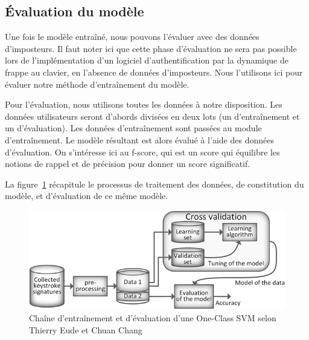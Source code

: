 \subsection{Évaluation du modèle}

Une fois le modèle entraîné, nous pouvons l'évaluer avec des données d'imposteurs. Il faut noter ici que cette phase d'évaluation ne sera pas possible lors de l'implémentation d'un logiciel d'authentification par la dynamique de frappe au clavier, en l'absence de données d'imposteurs. Nous l'utilisons ici pour évaluer notre méthode d'entraînement du modèle.

Pour l'évaluation, nous utilisons toutes les données à notre disposition. Les données utilisateurs seront d'abords divisées en deux lots (un d'entraînement et un d'évaluation). Les données d'entraînement sont passées au module d'entraînement. Le modèle résultant est alors évalué à l'aide des données d'évaluation. On s'intéresse ici au f-score, qui est un score qui équilibre les notions de rappel et de précision pour donner un score significatif.

La figure~\ref{ocsvm} récapitule le processus de traitement des données, de constitution du modèle, et d'évaluation de ce même modèle.

\begin{figure}[]
    \centering
    \includegraphics[width=\linewidth]{res/ocsvm.png}
    \caption{Chaîne d'entraînement et d'évaluation d'une One-Class SVM selon Thierry Eude et Chuan Chang\cite{doi:10.1111/coin.12122}}
    \label{ocsvm}
\end{figure}
